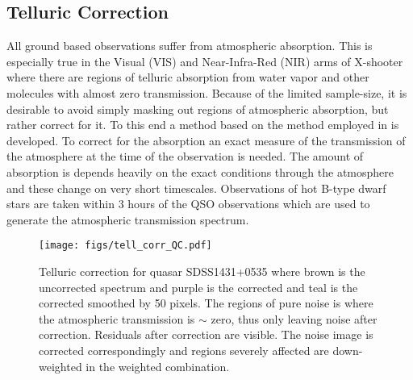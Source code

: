 \documentclass{aa}    %
\newcommand{\figlabel}[1]{\label{fig:#1}}
\newcommand{\sectlabel}[1]{\label{sect:#1}}
\begin{document}




\subsection{Telluric Correction}   \sectlabel{telluric}

All ground based observations suffer from atmospheric absorption. This
is especially true in the Visual (VIS) and Near-Infra-Red (NIR) arms
of X-shooter where there are regions of telluric absorption from water
vapor and other molecules with almost zero transmission. Because of
the limited sample-size, it is desirable to avoid simply masking out
regions of atmospheric absorption, but rather correct for it. To this
end a method based on the method employed in \citet{Chen2014} is
developed.  To correct for the absorption an exact measure of the
transmission of the atmosphere at the time of the observation is
needed. The amount of absorption is depends heavily on the exact
conditions through the atmosphere and these change on very short
timescales. Observations of hot B-type dwarf stars are taken within 3
hours of the QSO observations which are used to
generate the atmospheric transmission spectrum.

\begin{figure}[t!]
  \centering
  \texttt{[image: figs/tell\_corr\_QC.pdf]}
  \caption[]{Telluric correction for quasar SDSS1431+0535 where brown is the
uncorrected spectrum and purple is the corrected and teal is the corrected
smoothed by 50 pixels. The regions of pure noise is where the atmospheric
transmission is $\sim$ zero, thus only leaving noise after correction. Residuals
after correction are visible. The noise image is corrected correspondingly and
regions severely affected are down-weighted in the weighted combination.}
\figlabel{telluric_qc}
\end{figure}
\end{document}
